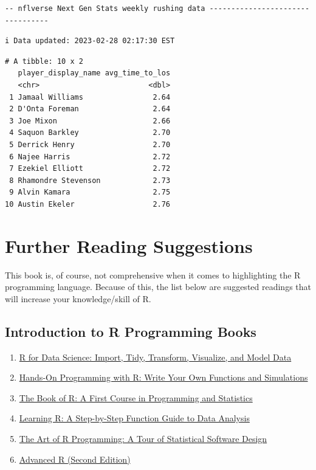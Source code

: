 \documentclass[
  letterpaper,
]{krantz}
\begin{document}
\begin{verbatim}
-- nflverse Next Gen Stats weekly rushing data ---------------------------------
\end{verbatim}

\begin{verbatim}
i Data updated: 2023-02-28 02:17:30 EST
\end{verbatim}

\begin{verbatim}
# A tibble: 10 x 2
   player_display_name avg_time_to_los
   <chr>                         <dbl>
 1 Jamaal Williams                2.64
 2 D'Onta Foreman                 2.64
 3 Joe Mixon                      2.66
 4 Saquon Barkley                 2.70
 5 Derrick Henry                  2.70
 6 Najee Harris                   2.72
 7 Ezekiel Elliott                2.72
 8 Rhamondre Stevenson            2.73
 9 Alvin Kamara                   2.75
10 Austin Ekeler                  2.76
\end{verbatim}

\hypertarget{sec-appendix-reading}{%
\chapter{Further Reading Suggestions}\label{sec-appendix-reading}}

This book is, of course, not comprehensive when it comes to highlighting
the R programming language. Because of this, the list below are
suggested readings that will increase your knowledge/skill of R.

\hypertarget{introduction-to-r-programming-books}{%
\section{Introduction to R Programming
Books}\label{introduction-to-r-programming-books}}

\begin{enumerate}
\def\labelenumi{\arabic{enumi}.}
\item
  \href{https://amzn.to/3ovLXUB}{R for Data Science: Import, Tidy,
  Transform, Visualize, and Model Data}
\item
  \href{https://amzn.to/3PYUVWf}{Hands-On Programming with R: Write Your
  Own Functions and Simulations}
\item
  \href{https://amzn.to/3J8lWEv}{The Book of R: A First Course in
  Programming and Statistics}
\item
  \href{https://amzn.to/3zcjYhA}{Learning R: A Step-by-Step Function
  Guide to Data Analysis}
\item
  \href{https://amzn.to/3OBMjn2}{The Art of R Programming: A Tour of
  Statistical Software Design}
\item
  \href{https://amzn.to/3zbBT8f}{Advanced R (Second Edition)}
\end{enumerate}
\end{document}
